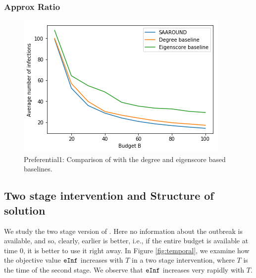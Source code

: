 \subsubsection{Approx Ratio}
\begin{figure}[!h]
    \centering
    \includegraphics[scale = 0.55]{Figuresnew/pa1_approx.png}
    \caption{Preferential1: Comparison of \algo{} with the degree and eigenscore based baselines.}
    \label{fig:pa1approx}
\end{figure}
\subsection{Two stage intervention and Structure of solution}
We study the two stage version of \prob{}. Here no information about the outbreak is available, and so, clearly, earlier is better, i.e., if the entire budget is available at time $0$, it is better to use it right away. In Figure \ref{fig:temporal}, we examine how the objective value $\texttt{eInf}{}$ increases with $T$ in a two stage intervention, where $T$ is the time of the second stage. We observe that $\texttt{eInf}{}$ increases very rapidly with $T$.

